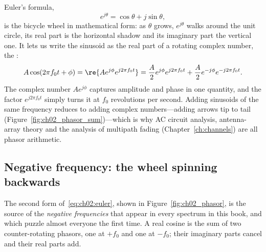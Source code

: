 Euler's formula,
\begin{equation}
e^{j\theta}=\cos\theta+j\sin\theta ,
\end{equation}
is the bicycle wheel in mathematical form: as $\theta$ grows, $e^{j\theta}$ walks around the unit
circle, its real part is the horizontal shadow and its imaginary part the vertical one. It lets us
write the sinusoid as the real part of a rotating complex number, the :
\begin{equation}
A\cos(2\pi f_0 t+\phi)=\re\{A e^{j\phi}e^{j2\pi f_0 t}\}
=\frac{A}{2}e^{j\phi}e^{j2\pi f_0 t}+\frac{A}{2}e^{-j\phi}e^{-j2\pi f_0 t}.
\label{eq:ch02:euler}
\end{equation}
The complex number $Ae^{j\phi}$ captures amplitude and phase in one quantity, and the factor
$e^{j2\pi f_0 t}$ simply turns it at $f_0$ revolutions per second. Adding sinusoids of the same
frequency reduces to adding complex numbers---adding arrows tip to tail
(Figure~\ref{fig:ch02_phasor_sum})---which is why AC circuit analysis, antenna-array theory and the
analysis of multipath fading (Chapter~\ref{ch:channels}) are all phasor arithmetic.



\subsection{Negative frequency: the wheel spinning backwards}

The second form of~\eqref{eq:ch02:euler}, shown in Figure~\ref{fig:ch02_phasor}, is the source of the
\emph{negative frequencies} that appear in every spectrum in this book, and which puzzle almost
everyone the first time. A real cosine is the sum of two counter-rotating phasors, one at $+f_0$ and
one at $-f_0$; their imaginary parts cancel and their real parts add.

